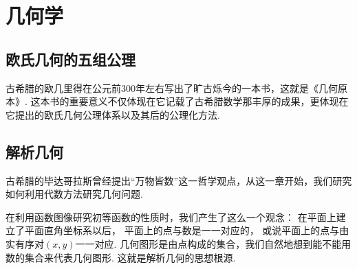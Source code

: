 \part{几何学}

\chapter{欧氏几何的五组公理}
古希腊的欧几里得在公元前300年左右写出了旷古烁今的一本书，这就是《几何原本》.
这本书的重要意义不仅体现在它记载了古希腊数学那丰厚的成果，更体现在它提出的欧氏几何公理体系以及其后的公理化方法.










\chapter{解析几何}
古希腊的毕达哥拉斯曾经提出“万物皆数”这一哲学观点，从这一章开始，我们研究如何利用代数方法研究几何问题.

在利用函数图像研究初等函数的性质时，我们产生了这么一个观念：
在平面上建立了平面直角坐标系以后，
平面上的点与数是一一对应的，
或说平面上的点与由实有序对\((x,y)\)一一对应.
几何图形是由点构成的集合，我们自然地想到能不能用数的集合来代表几何图形.
这就是解析几何的思想根源.


